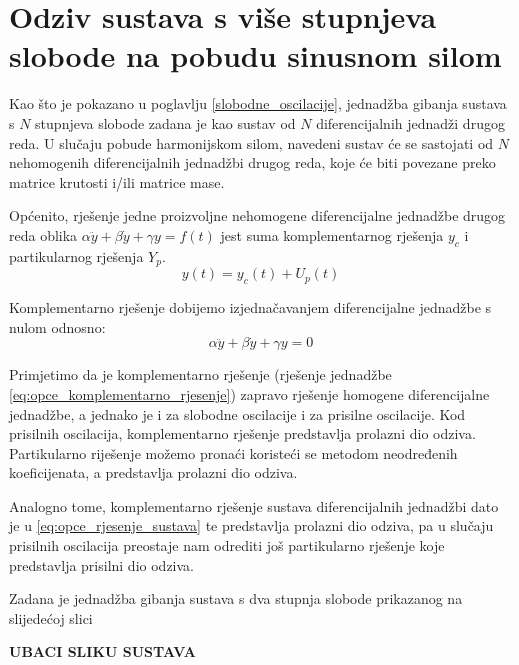 \documentclass{rgn}
\begin{document}
\section{Odziv sustava s više stupnjeva slobode na pobudu sinusnom
silom}\label{mdof_prisilne}
Kao što je pokazano u poglavlju \ref{slobodne_oscilacije}, jednadžba gibanja sustava
s $N$ stupnjeva slobode zadana je kao sustav od $N$ diferencijalnih jednadži drugog
reda. U slučaju pobude harmonijskom silom, navedeni sustav će se sastojati od $N$
nehomogenih diferencijalnih jednadžbi drugog reda, koje će biti povezane preko
matrice krutosti i/ili matrice mase. 
\par
Općenito, rješenje jedne proizvoljne nehomogene diferencijalne jednadžbe drugog reda
oblika $\alpha\ddot{y}+\beta\dot{y}+\gamma y= f(t)$ jest suma komplementarnog
rješenja $y_c$ i partikularnog rješenja $Y_p$.
\begin{equation}
    y(t)=y_c(t)+U_p(t)
\end{equation}

Komplementarno rješenje dobijemo izjednačavanjem diferencijalne jednadžbe s nulom
odnosno:
\begin{equation}\label{eq:opce_komplementarno_rjesenje}
    \alpha\ddot{y}+\beta\dot{y}+\gamma y=0
\end{equation}

Primjetimo da je komplementarno rješenje (rješenje jednadžbe \eqref{eq:opce_komplementarno_rjesenje}) 
zapravo rješenje homogene diferencijalne jednadžbe, a jednako je i za slobodne 
oscilacije i za prisilne oscilacije. Kod prisilnih oscilacija, komplementarno 
rješenje predstavlja prolazni dio odziva. Partikularno riješenje možemo pronaći 
koristeći se metodom neodređenih koeficijenata, a predstavlja prolazni dio odziva.
\par

Analogno tome, komplementarno rješenje sustava diferencijalnih jednadžbi dato je u
\eqref{eq:opce_rjesenje_sustava} te predstavlja prolazni dio odziva, pa u slučaju
prisilnih oscilacija preostaje nam odrediti još partikularno rješenje koje
predstavlja prisilni dio odziva. 
\par

Zadana je jednadžba gibanja sustava s dva stupnja slobode prikazanog na slijedećoj
slici

\textbf{UBACI SLIKU SUSTAVA}
\end{document}
